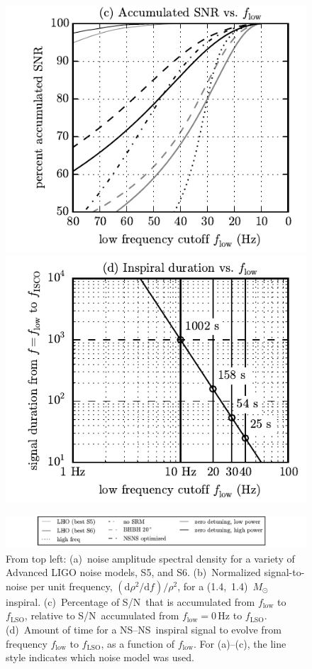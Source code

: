 \documentclass[preprint2]{aastex}
\newcommand{\NS}{NS}
\newcommand{\SNR}{S/N}%
\newcommand{\Msun}{\ensuremath{M_{\odot}}}
\begin{document}
\begin{figure}[b]
	\includegraphics{figures/accum_snr}%
	\includegraphics{figures/inspiral_tf_relation}

	\includegraphics{figures/psd_legend}

	\caption{\label{fig:low-frequency-cutoff}From top left:  (a)~noise amplitude spectral density for a variety of Advanced LIGO noise models, S5, and S6.  (b)~Normalized signal-to-noise per unit frequency, $(\mathrm{d}\rho^2/\mathrm{d}f)/\rho^2$, for a (1.4,~1.4)~$\Msun$ inspiral.  (c)~Percentage of \SNR\ that is accumulated from $f_\mathrm{low}$ to $f_\mathrm{LSO}$, relative to \SNR\ accumulated from $f_\mathrm{low} = 0\,\mathrm{Hz}$ to $f_\mathrm{LSO}$.    (d)~Amount of time for a \NS--\NS\ inspiral signal to evolve from frequency $f_\mathrm{low}$ to $f_\mathrm{LSO}$, as a function of $f_\mathrm{low}$.  For (a)--(c), the line style indicates which noise model was used.}
\end{figure}



\end{document}
